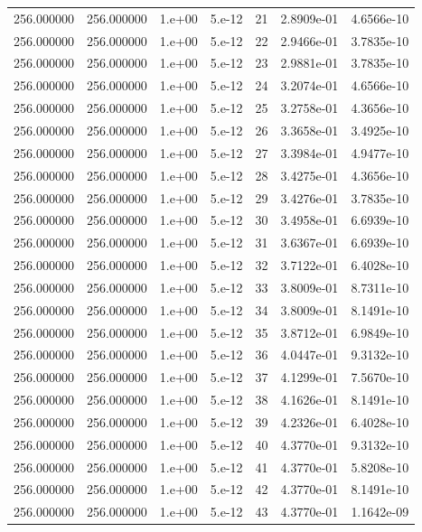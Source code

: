 \begin{table}[htbp]
\begin{tabular}{rrrrrrr}
256.000000 & 256.000000 & 1.e+00 & 5.e-12 & 21 & 2.8909e-01 & 4.6566e-10 \\
256.000000 & 256.000000 & 1.e+00 & 5.e-12 & 22 & 2.9466e-01 & 3.7835e-10 \\
256.000000 & 256.000000 & 1.e+00 & 5.e-12 & 23 & 2.9881e-01 & 3.7835e-10 \\
256.000000 & 256.000000 & 1.e+00 & 5.e-12 & 24 & 3.2074e-01 & 4.6566e-10 \\
256.000000 & 256.000000 & 1.e+00 & 5.e-12 & 25 & 3.2758e-01 & 4.3656e-10 \\
256.000000 & 256.000000 & 1.e+00 & 5.e-12 & 26 & 3.3658e-01 & 3.4925e-10 \\
256.000000 & 256.000000 & 1.e+00 & 5.e-12 & 27 & 3.3984e-01 & 4.9477e-10 \\
256.000000 & 256.000000 & 1.e+00 & 5.e-12 & 28 & 3.4275e-01 & 4.3656e-10 \\
256.000000 & 256.000000 & 1.e+00 & 5.e-12 & 29 & 3.4276e-01 & 3.7835e-10 \\
256.000000 & 256.000000 & 1.e+00 & 5.e-12 & 30 & 3.4958e-01 & 6.6939e-10 \\
256.000000 & 256.000000 & 1.e+00 & 5.e-12 & 31 & 3.6367e-01 & 6.6939e-10 \\
256.000000 & 256.000000 & 1.e+00 & 5.e-12 & 32 & 3.7122e-01 & 6.4028e-10 \\
256.000000 & 256.000000 & 1.e+00 & 5.e-12 & 33 & 3.8009e-01 & 8.7311e-10 \\
256.000000 & 256.000000 & 1.e+00 & 5.e-12 & 34 & 3.8009e-01 & 8.1491e-10 \\
256.000000 & 256.000000 & 1.e+00 & 5.e-12 & 35 & 3.8712e-01 & 6.9849e-10 \\
256.000000 & 256.000000 & 1.e+00 & 5.e-12 & 36 & 4.0447e-01 & 9.3132e-10 \\
256.000000 & 256.000000 & 1.e+00 & 5.e-12 & 37 & 4.1299e-01 & 7.5670e-10 \\
256.000000 & 256.000000 & 1.e+00 & 5.e-12 & 38 & 4.1626e-01 & 8.1491e-10 \\
256.000000 & 256.000000 & 1.e+00 & 5.e-12 & 39 & 4.2326e-01 & 6.4028e-10 \\
256.000000 & 256.000000 & 1.e+00 & 5.e-12 & 40 & 4.3770e-01 & 9.3132e-10 \\
256.000000 & 256.000000 & 1.e+00 & 5.e-12 & 41 & 4.3770e-01 & 5.8208e-10 \\
256.000000 & 256.000000 & 1.e+00 & 5.e-12 & 42 & 4.3770e-01 & 8.1491e-10 \\
256.000000 & 256.000000 & 1.e+00 & 5.e-12 & 43 & 4.3770e-01 & 1.1642e-09 \\

\end{tabular}
\end{table}
